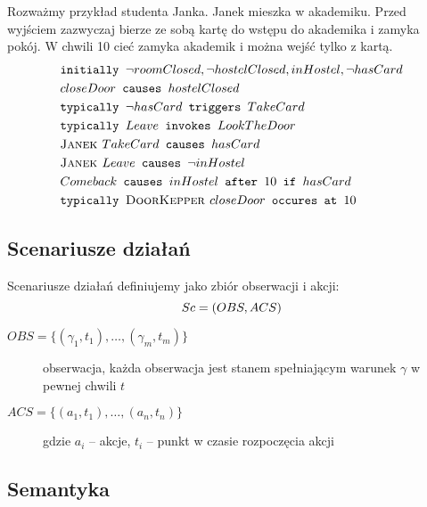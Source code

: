 \begin{example}\label{przyk:syntaktyka_jezyka_akcji}
	Rozważmy przykład studenta Janka. Janek mieszka w akademiku.
	Przed wyjściem zazwyczaj bierze ze sobą kartę do wstępu do akademika i zamyka pokój.
	W chwili 10 cieć zamyka akademik i można wejść tylko z kartą.
	\begin{align*}
	&\texttt{initially } \neg roomClosed, \neg hostelClosed, inHostel, \neg hasCard \\
	&closeDoor \texttt{ causes } hostelClosed \\
	&\texttt{typically } \neg hasCard \texttt{ triggers } TakeCard \\
	&\texttt{typically } Leave \texttt{ invokes } LookTheDoor \\
	&\textsc{Janek } TakeCard \texttt{ causes } hasCard \\
	&\textsc{Janek } Leave \texttt{ causes } \neg inHostel \\
	&Comeback \texttt{ causes } inHostel \texttt{ after } 10 \texttt{ if } hasCard \\
	&\texttt{typically } \textsc{DoorKepper } closeDoor \texttt{ occures at } 10
	\end{align*}
\end{example}


\subsection{Scenariusze działań}
\begin{definition}
Scenariusze działań definiujemy jako zbiór obserwacji i akcji:
\begin{equation}
	Sc = (OBS, ACS)\\
\end{equation}
\begin{description}
	\item[$OBS = \lbrace(\gamma_1, t_1), \dots, (\gamma_m, t_m)\rbrace$]
	obserwacja, każda obserwacja jest stanem spełniającym warunek $\gamma$ w pewnej chwili $t$
	\item[$ACS = \lbrace(a_1, t_1), \dots, (a_n, t_n) \rbrace$]
	gdzie $a_i$ -- akcje, $t_i$ -- punkt w czasie rozpoczęcia akcji
\end{description}
\end{definition}

\subsection{Semantyka}

